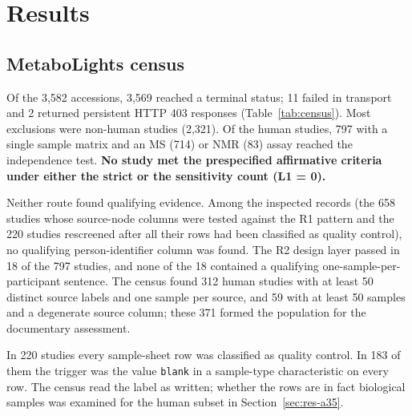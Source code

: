 \section{Results}\label{sec:results}

\subsection{MetaboLights census}\label{sec:res-census}

Of the 3,582 accessions, 3,569 reached a terminal status; 11 failed in transport and 2 returned persistent HTTP 403
responses (Table~\ref{tab:census}). Most exclusions were non-human studies (2,321). Of the human studies, 797 with a
single sample matrix and an MS (714) or NMR (83) assay reached the independence test. \textbf{No study met the
prespecified affirmative criteria under either the strict or the sensitivity count (L1 = 0).}

Neither route found qualifying evidence. Among the inspected records (the 658 studies whose source-node columns were
tested against the R1 pattern and the 220 studies rescreened after all their rows had been classified as quality
control), no qualifying person-identifier column was found. The R2 design layer passed in 18 of the 797 studies, and
none of the 18 contained a qualifying one-sample-per-participant sentence. The census found 312 human studies with at
least 50 distinct source labels and one sample per source, and 59 with at least 50 samples and a degenerate source
column; these 371 formed the population for the documentary assessment.

In 220 studies every sample-sheet row was classified as quality control. In 183 of them the trigger was the value
\texttt{blank} in a sample-type characteristic on every row. The census read the label as written; whether the rows
are in fact biological samples was examined for the human subset in Section~\ref{sec:res-a35}.


